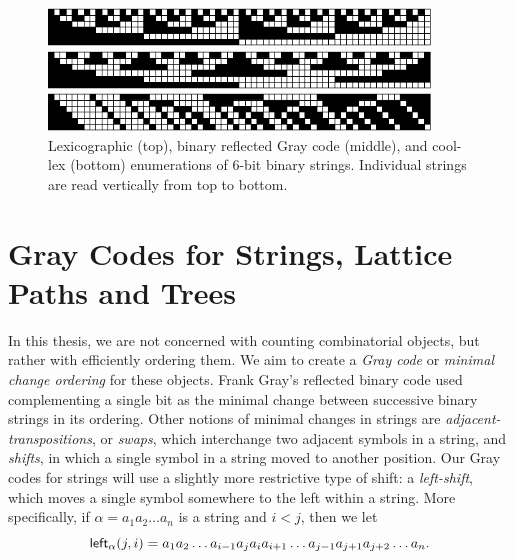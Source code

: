 \begin{figure}
    \centering
\includegraphics[width=4in]{BLX6-cropped.pdf} 

\includegraphics[width=4in]{BRGC6-cropped.pdf} 

\includegraphics[width=4in]{BCLX6-cropped.pdf} 

    \caption{Lexicographic (top), binary reflected Gray code (middle), and cool-lex (bottom) enumerations of 6-bit binary strings. Individual strings are read vertically from top to bottom.}
    \label{binary}
\end{figure}

\section{Gray Codes for Strings, Lattice Paths and Trees}
In this thesis, we are not concerned with counting combinatorial objects, but rather with efficiently ordering them.  We aim to create a \emph{Gray code} or \emph{minimal change ordering} for these objects.  Frank Gray's reflected binary code used complementing a single bit as the minimal change between successive binary strings in its ordering.  Other notions of minimal changes in strings are \emph{adjacent-transpositions}, or \emph{swaps}, which interchange two adjacent symbols in a string, and \emph{shifts}, in which a single symbol in a string moved to another position. Our Gray codes for strings will use a slightly more restrictive type of shift: a \emph{left-shift}, which moves a single symbol somewhere to the left within a string. 
More specifically, if $\alpha = a_1 a_2 \ldots a_n$ is a string and $i < j$, then we let
\begin{equation*}
\leftshift[\alpha]{j}{i} = a_1 a_2 \ldots a_{i-1} a_j a_{i} a_{i+1} \ldots a_{j-1} a_{j+1} a_{j+2} \ldots a_n.
\end{equation*}

